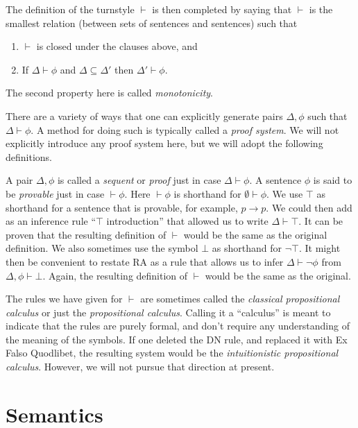 \bigskip The definition of the turnstyle $\vdash$ is then completed by
saying that $\vdash$ is the smallest relation (between sets of
sentences and sentences) such that
\begin{enumerate}
\item $\vdash$ is closed under the clauses above, and
\item If $\Delta \vdash \phi$ and $\Delta \subseteq \Delta '$ then
  $\Delta '\vdash \phi$.
\end{enumerate}
The second property here is called \emph{monotonicity}.

There are a variety of ways that one can explicitly generate pairs
$\Delta ,\phi$ such that $\Delta\vdash\phi$.  A method for doing such
is typically called a \emph{proof system}.  We will not explicitly
introduce any proof system here, but we will adopt the following
definitions.

\begin{defn} A pair $\Delta ,\phi$ is called a \emph{sequent} or
  \emph{proof} just in case $\Delta \vdash \phi$.  A sentence $\phi$
  is said to be \emph{provable} just in case $\vdash\phi$.  Here
  $\vdash\phi$ is shorthand for $\emptyset \vdash \phi$.  We use
  $\top$ as shorthand for a sentence that is provable, for example,
  $p\to p$.  We could then add as an inference rule ``$\top$
  introduction'' that allowed us to write $\Delta\vdash \top$.  It can
  be proven that the resulting definition of $\vdash$ would be the
  same as the original definition.  We also sometimes use the symbol
  $\bot$ as shorthand for $\neg\top$.  It might then be convenient to
  restate RA as a rule that allows us to infer $\Delta\vdash\neg\phi$
  from $\Delta,\phi\vdash\bot$.  Again, the resulting definition of
  $\vdash$ would be the same as the original. \end{defn}

\begin{disc} The rules we have given for $\vdash$ are sometimes called
  the \emph{classical propositional calculus} or just the
  \emph{propositional calculus}.  Calling it a ``calculus'' is meant
  to indicate that the rules are purely formal, and don't require any
  understanding of the meaning of the symbols.  If one deleted the DN
  rule, and replaced it with Ex Falso Quodlibet, the resulting system
  would be the \emph{intuitionistic propositional calculus}.  However,
  we will not pursue that direction at present. \end{disc}


\section{Semantics}

